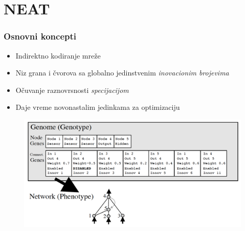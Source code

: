 \documentclass{beamer}
\begin{document}
\section{NEAT}
\begin{frame} 
\frametitle{Osnovni koncepti}
\begin{itemize}
\item Indirektno kodiranje mreže
\item Niz grana i čvorova sa globalno jedinstvenim \emph{inovacionim brojevima}
\item Očuvanje raznovrsnosti \emph{specijacijom}
\item Daje vreme novonastalim jedinkama za optimizaciju
\end{itemize}

\begin{figure}
\includegraphics[scale = 0.15]{images/encoding.png}
\end{figure}

\end{frame}
\end{document}

